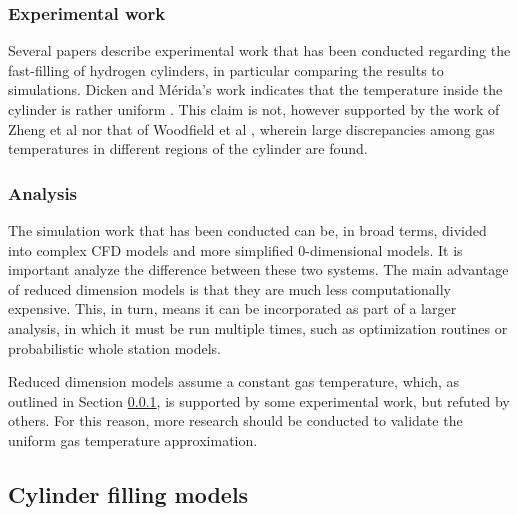 \subsubsection{Experimental work}
\label{sec:experimental_work}
Several papers describe experimental work that has been conducted regarding the fast-filling of hydrogen cylinders, in particular comparing the results to simulations. Dicken and M\'erida's work indicates that the temperature inside the cylinder is rather uniform \cite{Dicken2007}. This claim is not, however supported by the work of  Zheng et al  nor that of Woodfield et al \cite{Woodfield2008}, wherein large discrepancies among gas temperatures in different regions of the cylinder are found.

\subsubsection{Analysis}


The simulation work that has been conducted can be, in broad terms, divided into complex CFD models and more simplified 0-dimensional models. It is important analyze the difference between these two systems. The main advantage of reduced dimension models is that they are much less computationally expensive. This, in turn, means it can be incorporated as part of a larger analysis, in which it must be run multiple times, such as optimization routines or probabilistic whole station models.

Reduced dimension models assume a constant gas temperature, which, as outlined in Section \ref{sec:experimental_work}, is supported by some experimental work, but refuted by others. For this reason, more research should be conducted to validate the uniform gas temperature approximation.


\subsection{Cylinder filling models}

